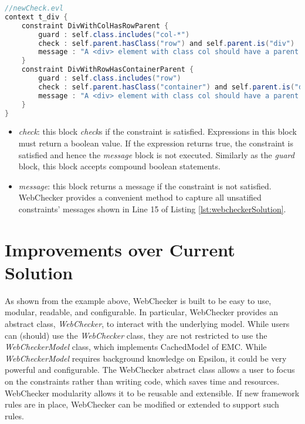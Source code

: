 \documentclass[conference]{IEEETran}
\begin{document}
\begin{lstlisting}[language=Java, caption=Enforcing Bootstrap Grid Rule by Using WebChecker, label={lst:webcheckerSolution}]
//newCheck.evl
context t_div { 
    constraint DivWithColHasRowParent {
        guard : self.class.includes("col-*")
        check : self.parent.hasClass("row") and self.parent.is("div")
        message : "A <div> element with class col should have a parent <div> element with class row."
    }
    constraint DivWithRowHasContainerParent {
        guard : self.class.includes("row")
        check : self.parent.hasClass("container") and self.parent.is("div")
        message : "A <div> element with class col should have a parent <div> element with class row."
    }
}

\end{lstlisting}

\begin{itemize}
\item \textit{check}: this block \textit{check}s if the constraint is satisfied. Expressions in this block must return a boolean value. If the expression returns true, the constraint is satisfied and hence the \textit{message} block is not executed. Similarly as the \textit{guard} block, this block accepts compound boolean statements.
\item \textit{message}: this block returns a message if the constraint is not satisfied. WebChecker provides a convenient method to capture all unsatified constraints' messages shown in Line 15 of Listing \ref{lst:webcheckerSolution}.  
\end{itemize}

\section{Improvements over Current Solution}
As shown from the example above, WebChecker is built to be easy to use, modular, readable, and configurable. In particular, WebChecker provides an abstract class, \textit{WebChecker},  to interact with the underlying model. While users can (should) use the \textit{WebChecker} class, they are not restricted to use the \textit{WebCheckerModel} class, which implements CachedModel of EMC. While \textit{WebCheckerModel} requires background knowledge on Epsilon, it could be very powerful and configurable. The WebChecker abstract class allows a user to focus on the constraints rather than writing code, which saves time and resources. WebChecker modularity allows it to be reusable and extensible. If new framework rules are in place, WebChecker can be modified or extended to support such rules. 
\end{document}
